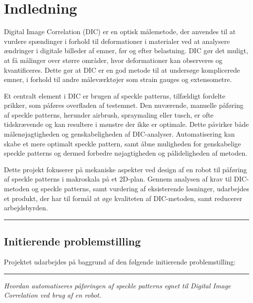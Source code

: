 \chapter{Indledning}
Digital Image Correlation (DIC) er en optisk målemetode, der anvendes til at vurdere spændinger i forhold til deformationer i materialer ved at analysere ændringer i digitale billeder af emner, før og efter belastning. DIC gør det muligt, at få målinger over større områder, hvor deformationer kan observeres og kvantificeres. Dette gør at DIC er en god metode til at undersøge komplicerede emner, i forhold til andre måleværktøjer som strain gauges og extensometre.

Et centralt element i DIC er brugen af speckle patterns, tilfældigt fordelte prikker, som påføres overfladen af testemnet. Den nuværende, manuelle påføring af speckle patterns, herunder airbrush, spraymaling eller tusch, er ofte tidskrævende og kan resultere i mønstre der ikke er optimale. Dette påvirker både målenøjagtigheden og genskabeligheden af DIC-analyser. Automatisering kan skabe et mere optimalt speckle pattern, samt åbne muligheden for genskabelige speckle patterns og dermed forbedre nøjagtigheden og pålideligheden af metoden.

Dette projekt fokuserer på mekaniske aspekter ved design af en robot til påføring af speckle patterns i makroskala på et 2D-plan. Gennem analysen af krav til DIC-metoden og speckle patterns, samt vurdering af eksisterende løsninger, udarbejdes et produkt, der har til formål at øge kvaliteten af DIC-metoden, samt reducerer arbejdsbyrden.




\plainbreak{2}
\section{Initierende problemstilling}
Projektet udarbejdes på baggrund af den følgende initierende problemstilling: \plainbreak{-0.1}
\begin{displayquote}  \centering 
\textit{Hvordan automatiseres påføringen af speckle patterns egnet til Digital Image Correlation ved brug af en robot.} %
\end{displayquote}


